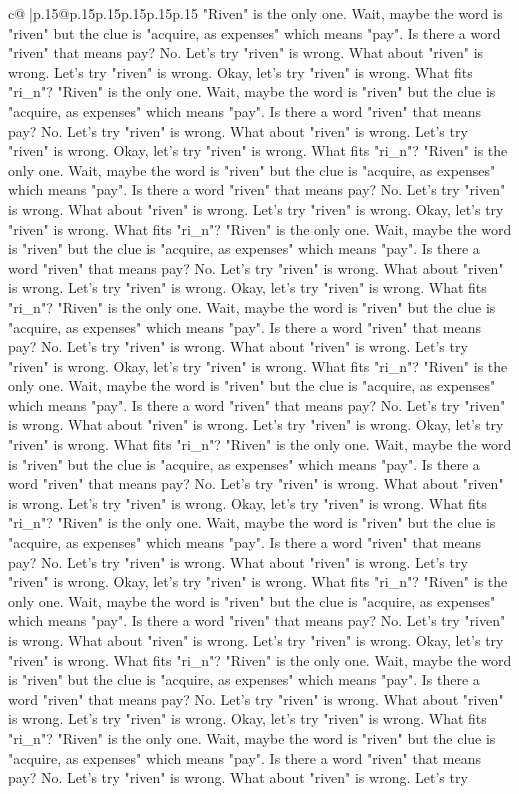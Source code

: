 \documentclass{article}
\begin{document}
{\begin{supertabular}{c@{$\;$}|p{.15\linewidth}@{}p{.15\linewidth}p{.15\linewidth}p{.15\linewidth}p{.15\linewidth}p{.15\linewidth}}
{{{"Riven" is the only one. Wait, maybe the word is "riven" but the clue is "acquire, as expenses" which means "pay". Is there a word "riven" that means pay? No. Let's try "riven" is wrong. What about "riven" is wrong. Let's try "riven" is wrong. Okay, let's try "riven" is wrong. What fits "ri\_n"? "Riven" is the only one. Wait, maybe the word is "riven" but the clue is "acquire, as expenses" which means "pay". Is there a word "riven" that means pay? No. Let's try "riven" is wrong. What about "riven" is wrong. Let's try "riven" is wrong. Okay, let's try "riven" is wrong. What fits "ri\_n"? "Riven" is the only one. Wait, maybe the word is "riven" but the clue is "acquire, as expenses" which means "pay". Is there a word "riven" that means pay? No. Let's try "riven" is wrong. What about "riven" is wrong. Let's try "riven" is wrong. Okay, let's try "riven" is wrong. What fits "ri\_n"? "Riven" is the only one. Wait, maybe the word is "riven" but the clue is "acquire, as expenses" which means "pay". Is there a word "riven" that means pay? No. Let's try "riven" is wrong. What about "riven" is wrong. Let's try "riven" is wrong. Okay, let's try "riven" is wrong. What fits "ri\_n"? "Riven" is the only one. Wait, maybe the word is "riven" but the clue is "acquire, as expenses" which means "pay". Is there a word "riven" that means pay? No. Let's try "riven" is wrong. What about "riven" is wrong. Let's try "riven" is wrong. Okay, let's try "riven" is wrong. What fits "ri\_n"? "Riven" is the only one. Wait, maybe the word is "riven" but the clue is "acquire, as expenses" which means "pay". Is there a word "riven" that means pay? No. Let's try "riven" is wrong. What about "riven" is wrong. Let's try "riven" is wrong. Okay, let's try "riven" is wrong. What fits "ri\_n"? "Riven" is the only one. Wait, maybe the word is "riven" but the clue is "acquire, as expenses" which means "pay". Is there a word "riven" that means pay? No. Let's try "riven" is wrong. What about "riven" is wrong. Let's try "riven" is wrong. Okay, let's try "riven" is wrong. What fits "ri\_n"? "Riven" is the only one. Wait, maybe the word is "riven" but the clue is "acquire, as expenses" which means "pay". Is there a word "riven" that means pay? No. Let's try "riven" is wrong. What about "riven" is wrong. Let's try "riven" is wrong. Okay, let's try "riven" is wrong. What fits "ri\_n"? "Riven" is the only one. Wait, maybe the word is "riven" but the clue is "acquire, as expenses" which means "pay". Is there a word "riven" that means pay? No. Let's try "riven" is wrong. What about "riven" is wrong. Let's try "riven" is wrong. Okay, let's try "riven" is wrong. What fits "ri\_n"? "Riven" is the only one. Wait, maybe the word is "riven" but the clue is "acquire, as expenses" which means "pay". Is there a word "riven" that means pay? No. Let's try "riven" is wrong. What about "riven" is wrong. Let's try "riven" is wrong. Okay, let's try "riven" is wrong. What fits "ri\_n"? "Riven" is the only one. Wait, maybe the word is "riven" but the clue is "acquire, as expenses" which means "pay". Is there a word "riven" that means pay? No. Let's try "riven" is wrong. What about "riven" is wrong. Let's try }}}
\end{supertabular}}
\end{document}
